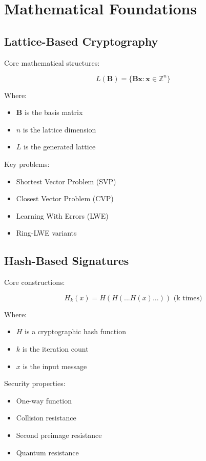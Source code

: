 \documentclass[12pt]{article}
\begin{document}
\section{Mathematical Foundations}

\subsection{Lattice-Based Cryptography}

Core mathematical structures:

\begin{equation}
L(\mathbf{B}) = \{\mathbf{Bx} : \mathbf{x} \in \mathbb{Z}^n\}
\end{equation}

Where:
\begin{itemize}
\item $\mathbf{B}$ is the basis matrix
\item $n$ is the lattice dimension
\item $L$ is the generated lattice
\end{itemize}

Key problems:

\begin{itemize}
\item Shortest Vector Problem (SVP)
\item Closest Vector Problem (CVP)
\item Learning With Errors (LWE)
\item Ring-LWE variants
\end{itemize}

\subsection{Hash-Based Signatures}

Core constructions:

\begin{equation}
H_k(x) = H(H(...H(x)...)) \text{ (k times)}
\end{equation}

Where:
\begin{itemize}
\item $H$ is a cryptographic hash function
\item $k$ is the iteration count
\item $x$ is the input message
\end{itemize}

Security properties:
\begin{itemize}
\item One-way function
\item Collision resistance
\item Second preimage resistance
\item Quantum resistance
\end{itemize}
\end{document}
